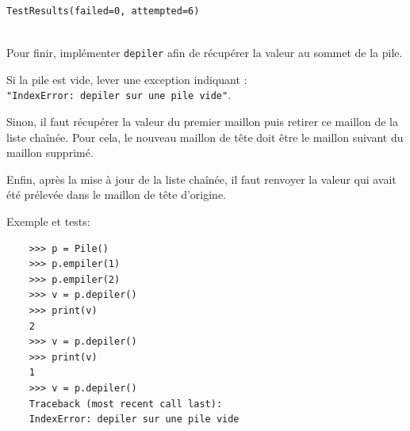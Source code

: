 \documentclass[a4paper,17pt]{extarticle}
\makeatletter
\newenvironment{eleve}%
{\begin{activite}\color{noiramu}\\[-0.5cm]}
{\end{activite}}
\newcommand{\boxspacing}{\kern\kvtcb@left@rule\kern\kvtcb@boxsep}
\newcommand{\prompt}[4]{
        \ttfamily\llap{{\color{#2}[#3]:\hspace{3pt}#4}}\vspace{-\baselineskip}
    }
\makeatother
\begin{document}
            \begin{tcolorbox}[breakable, size=fbox, boxrule=.5pt, pad at break*=1mm, opacityfill=0]
\prompt{Out}{outcolor}{4}{\boxspacing}
\begin{Verbatim}[commandchars=\\\{\}]
TestResults(failed=0, attempted=6)
\end{Verbatim}
\end{tcolorbox}
        \begin{eleve}
    Pour finir, implémenter \texttt{depiler} afin de récupérer la valeur au
sommet de la pile.

Si la pile est vide, lever une exception indiquant :
\texttt{"IndexError:\ depiler\ sur\ une\ pile\ vide"}.

Sinon, il faut récupérer la valeur du premier maillon puis retirer ce
maillon de la liste chaînée. Pour cela, le nouveau maillon de tête doit
être le maillon suivant du maillon supprimé.

Enfin, après la mise à jour de la liste chaînée, il faut renvoyer la
valeur qui avait été prélevée dans le maillon de tête d'origine.

Exemple et tests:

\begin{verbatim}
    >>> p = Pile()
    >>> p.empiler(1)
    >>> p.empiler(2)
    >>> v = p.depiler()
    >>> print(v)
    2
    >>> v = p.depiler()
    >>> print(v)
    1
    >>> v = p.depiler()
    Traceback (most recent call last):
    IndexError: depiler sur une pile vide
\end{verbatim}
        
        \end{eleve}
\end{document}
